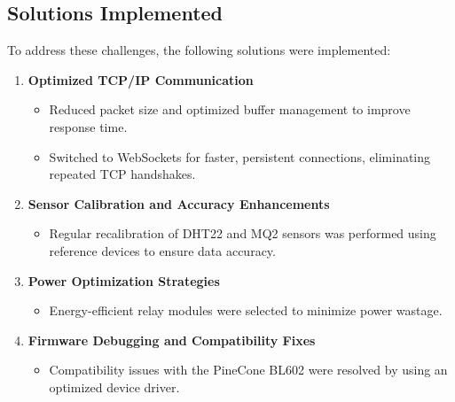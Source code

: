 \documentclass[a4paper]{scrartcl}
\begin{document}
\subsection{Solutions Implemented}
To address these challenges, the following solutions were implemented:
\begin{enumerate}
    \item \textbf{Optimized TCP/IP Communication}
        \begin{itemize}
            \item Reduced packet size and optimized buffer management to improve response time.
            \item Switched to WebSockets for faster, persistent connections, eliminating repeated TCP handshakes.
        \end{itemize}
    \item \textbf{Sensor Calibration and Accuracy Enhancements}
        \begin{itemize}
            \item Regular recalibration of DHT22 and MQ2 sensors was performed using reference devices to ensure data accuracy.
        \end{itemize}
    \item \textbf{Power Optimization Strategies}
        \begin{itemize}
            \item Energy-efficient relay modules were selected to minimize power wastage.
        \end{itemize}
    \item \textbf{Firmware Debugging and Compatibility Fixes}
        \begin{itemize}
            \item Compatibility issues with the PineCone BL602 were resolved by using an optimized device driver.
        \end{itemize}
\end{enumerate}
\end{document}
